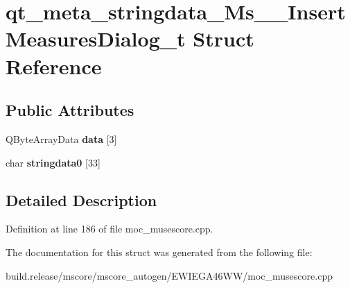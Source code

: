 \hypertarget{structqt__meta__stringdata___ms_____insert_measures_dialog__t}{}\section{qt\+\_\+meta\+\_\+stringdata\+\_\+\+Ms\+\_\+\+\_\+\+Insert\+Measures\+Dialog\+\_\+t Struct Reference}
\label{structqt__meta__stringdata___ms_____insert_measures_dialog__t}
\subsection*{Public Attributes}
\begin{DoxyCompactItemize}
\item 
\mbox{\label{structqt__meta__stringdata___ms_____insert_measures_dialog__t_a739d586f0048c3e1d5997d56f1be1b68}} 
Q\+Byte\+Array\+Data {\bfseries data} \mbox{[}3\mbox{]}
\item 
\mbox{\label{structqt__meta__stringdata___ms_____insert_measures_dialog__t_ac0d04608f1db2d4fc4a961b3e319edeb}} 
char {\bfseries stringdata0} \mbox{[}33\mbox{]}
\end{DoxyCompactItemize}


\subsection{Detailed Description}


Definition at line 186 of file moc\+\_\+musescore.\+cpp.



The documentation for this struct was generated from the following file\+:\begin{DoxyCompactItemize}
\item 
build.\+release/mscore/mscore\+\_\+autogen/\+E\+W\+I\+E\+G\+A46\+W\+W/moc\+\_\+musescore.\+cpp\end{DoxyCompactItemize}
